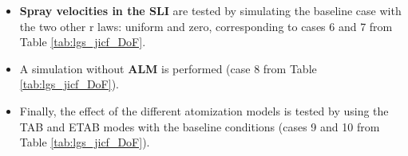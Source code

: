 \begin{itemize}
	\item \textbf{Spray velocities in the SLI} are tested by simulating the baseline case with the two other $\text{r}$ laws: uniform and zero, corresponding to cases 6 and 7 from Table \ref{tab:lgs_jicf_DoF}.
	
	\item A simulation without \textbf{ALM} is performed (case 8 from Table \ref{tab:lgs_jicf_DoF}).
	
	\item Finally, the effect of the different atomization models is tested by using the TAB and ETAB modes with the baseline conditions (cases 9 and 10 from Table \ref{tab:lgs_jicf_DoF}).	
	
\end{itemize}

\clearpage
	
